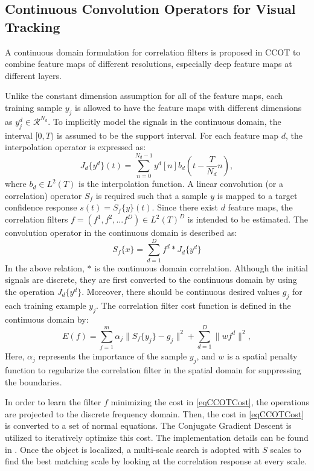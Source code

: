 \documentclass[journal]{IEEEtran}
\begin{document}
\subsection{Continuous Convolution Operators for Visual Tracking}
\label{secCCOT}
A continuous domain formulation for correlation filters is proposed in CCOT \cite{CCOT} to combine feature maps of different resolutions, especially deep feature maps at different layers.

Unlike the constant dimension assumption for all of the feature maps, each training sample $y_j$ is allowed to have the feature maps with different dimensions as $y_j^{d} \in \mathcal{R}^{N_d}$. To implicitly model the signals in the continuous domain, the interval $[0,T)$ is assumed to be the support interval. For each feature map $d$, the interpolation operator is expressed as:
\begin{equation}
\label{eqCCOTInterp}
J_d\{y^d\}(t) = \sum\limits_{n=0}^{N_d-1}y^d[n]b_d \left(t-\frac{T}{N_d} n \right),
\end{equation}
where $b_d \in L^2(T)$ is the interpolation function. A linear convolution (or a correlation) operator $S_f$ is required such that a sample $y$ is mapped to a target confidence response $s(t)=S_f\{y\}(t)$. Since there exist $d$ feature maps, the correlation filters $f = (f^1, f^2, ... f^D) \in L^2(T)^D$ is intended to be estimated. The convolution operator in the continuous domain is described as:
\begin{equation}
\label{eqCCOTConvOp}
S_f\{x\}=\sum\limits_{d=1}^D f^d \ast J_d\{y^d\}
\end{equation}
In the above relation, $\ast$ is the continuous domain correlation. Although the initial signals are discrete, they are first converted to the continuous domain by using the operation $J_d\{y^d\}$. Moreover, there should be continuous desired values $g_j$ for each training example $y_j$. The correlation filter cost function is defined in the continuous domain by:
\begin{equation}
\label{eqCCOTCost}
E(f) =  \sum\limits_{j=1}^m \alpha_j \lVert S_f\{y_j\}-g_j \rVert^2 + \sum\limits_{d=1}^D \lVert w f^d \rVert^2,
\end{equation}
Here, $\alpha_j$ represents the importance of the sample $y_j$, and $w$ is a spatial penalty function to regularize the correlation filter in the spatial domain for suppressing the boundaries.

In order to learn the filter $f$ minimizing the cost in \eqref{eqCCOTCost}, the operations are projected to the discrete frequency domain. Then, the cost in \eqref{eqCCOTCost} is converted to a set of normal equations. The Conjugate Gradient Descent is utilized to iteratively optimize this cost. The implementation details can be found in \cite{CCOT}. Once the object is localized, a multi-scale search is adopted with $S$ scales to find the best matching scale by looking at the correlation response at every scale.
\end{document}
